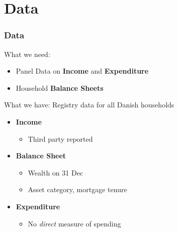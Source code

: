 \documentclass{beamer}
\begin{document}
\section{Data}
\frame
{
	\label{data}
	\frametitle{Data}
	What we need:
	\begin{itemize}
		\item Panel Data on \textbf{Income} and \textbf{Expenditure}
		\item Household \textbf{Balance Sheets} 
	\end{itemize}
	\bigskip
	\pause
	What we have: Registry data for all Danish households
	\begin{itemize}
		\item \textbf{Income}
		\begin{itemize}
			\item[] Third party reported
		\end{itemize}
		\item \textbf{Balance Sheet}
		\begin{itemize}
			\item[] Wealth on 31 Dec
			\item[] Asset category, mortgage tenure \hspace{1.5cm} 
		\end{itemize}
	\item \textbf{Expenditure}
		\begin{itemize}
		\item[] No \textit{direct} measure of spending
		\end{itemize}
	\end{itemize}
}
\frame[t]
\end{document}
